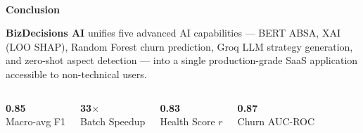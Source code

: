 \documentclass[aspectratio=169]{beamer}
\begin{document}
{
\begin{frame}
  \begin{center}
    {\color{iceblue}\Large\faChartBar}\\[0.2cm]
    {\color{white}\LARGE\textbf{Conclusion}}\\[0.4cm]
    \begin{tcolorbox}[colback=white!12, colframe=iceblue, arc=6pt, boxrule=1pt,
                      width=0.90\textwidth]
      \color{white}\small
      \textbf{BizDecisions AI} unifies five advanced AI capabilities ---
      BERT ABSA, XAI (LOO SHAP), Random Forest churn prediction, Groq LLM
      strategy generation, and zero-shot aspect detection --- into a single
      production-grade SaaS application accessible to non-technical users.
    \end{tcolorbox}
    \vspace{0.3cm}
    \begin{columns}[c]
        \begin{center}
          {\color{posgreen}\huge\textbf{0.85}}\\
          {\color{iceblue!80}\scriptsize Macro-avg F1}
        \end{center}
        \begin{center}
          {\color{neuyellow}\huge\textbf{33$\times$}}\\
          {\color{iceblue!80}\scriptsize Batch Speedup}
        \end{center}
        \begin{center}
          {\color{highlightblue}\huge\textbf{0.83}}\\
          {\color{iceblue!80}\scriptsize Health Score $r$}
        \end{center}
        \begin{center}
          {\color{negred!80}\huge\textbf{0.87}}\\
          {\color{iceblue!80}\scriptsize Churn AUC-ROC}
        \end{center}

\end{columns}
\end{center}
\end{frame}}
\end{document}
